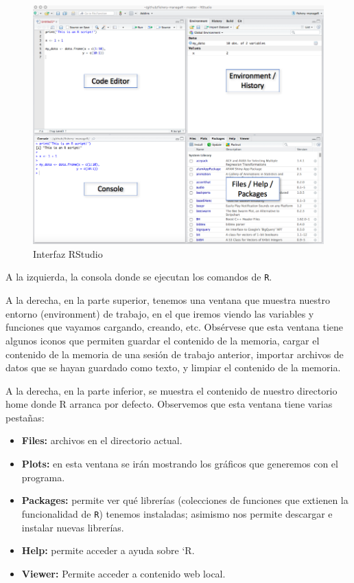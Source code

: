 \documentclass[]{book}
\providecommand{\tightlist}{%
  \setlength{\itemsep}{0pt}\setlength{\parskip}{0pt}}
\begin{document}
\begin{figure}

{\centering \includegraphics[width=1\linewidth]{figures/rstudio_ide} 

}

\caption{Interfaz RStudio}\label{fig:pressure}
\end{figure}

A la izquierda, la consola donde se ejecutan los comandos de \texttt{R}.

A la derecha, en la parte superior, tenemos una ventana que muestra
nuestro entorno (environment) de trabajo, en el que iremos viendo las
variables y funciones que vayamos cargando, creando, etc. Obsérvese que
esta ventana tiene algunos iconos que permiten guardar el contenido de
la memoria, cargar el contenido de la memoria de una sesión de trabajo
anterior, importar archivos de datos que se hayan guardado como texto, y
limpiar el contenido de la memoria.

A la derecha, en la parte inferior, se muestra el contenido de nuestro
directorio home donde R arranca por defecto. Observemos que esta ventana
tiene varias pestañas:

\begin{itemize}
\tightlist
\item
  \textbf{Files:} archivos en el directorio actual.
\item
  \textbf{Plots:} en esta ventana se irán mostrando los gráficos que
  generemos con el programa.
\item
  \textbf{Packages:} permite ver qué librerías (colecciones de funciones
  que extienen la funcionalidad de \texttt{R}) tenemos instaladas;
  asimismo nos permite descargar e instalar nuevas librerías.
\item
  \textbf{Help:} permite acceder a ayuda sobre `R.
\item
  \textbf{Viewer:} Permite acceder a contenido web local.
\end{itemize}
\end{document}
